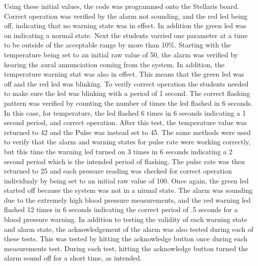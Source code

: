 \documentclass[12pt]{article} %
\begin{document}
Using these initial values, the code was programmed onto the Stellaris board. Correct operation was verified by the alarm not sounding, and the red led being off, indicating that no warning state was in effect. In addition the green led was on indicating a normal state. Next the students varried one parameter at a time to be outside of the acceptable range by more than 10\%. Starting with the temperature being set to an initial raw value of 50, the alarm was verified by hearing the aural annunciation coming from the system. In addition, the temperature warning stat was also in effect. This means that the green led was off and the red led was blinking. To verify correct operation the students needed to make sure the led was blinking with a period of 1 second. The correct flashing pattern was verified by counting the number of times the led flashed in 6 seconds. In this case, for temperature, the led flashed 6 times in 6 seconds indicating a 1 second period, and correct operation. After this test, the temperature value was returned to 42 and the Pulse was instead set to 45. The same methods were used to verify that the alarm and warning states for pulse rate were working correctly, but this time the warning led turned on 3 times in 6 seconds indicating a 2 second period which is the intended period of flashing. The pulse rate was then returned to 25 and each pressure reading was checked for correct operation individualy by being set to an initial raw value of 100. Once again, the green led started off because the system was not in a nirmal state. The alarm was sounding due to the extremely high blood pressure measurements, and the red warning led flashed 12 times in 6 seconds indicating the correct period of .5 seconds for a blood pressure warning. In addition to testing the validity of each warning state and alarm state, the acknowledgement of the alarm was also tested during each of these tests. This was tested by hitting the acknowledge button once during each measurements test. During each test, hitting the acknowledge button turned the alarm sound off for a short time, as intended. 
\end{document}

